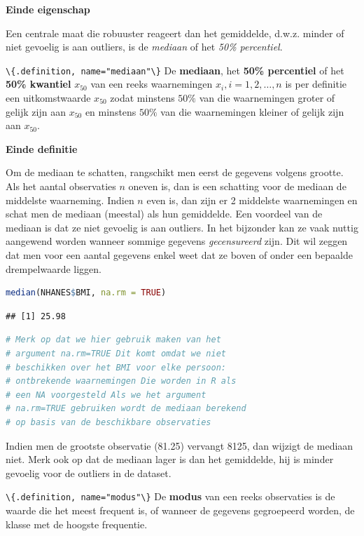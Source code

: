\documentclass[
  12pt,dutch,coursenotes]{book}
\newcommand{\passthrough}[1]{#1}
\begin{document}
\textbf{Einde eigenschap}

Een centrale maat die robuuster reageert dan het gemiddelde, d.w.z. minder
of niet gevoelig is aan outliers, is de \emph{mediaan} of het \emph{50\% percentiel}.

\passthrough{\lstinline!\{.definition, name="mediaan"\}!}
De \textbf{mediaan}, het \textbf{50\% percentiel} of het \textbf{50\%
kwantiel} \(x_{50}\) van een reeks waarnemingen \(x_i, i=1, 2, \dots, n\) is per
definitie een uitkomstwaarde \(x_{50}\) zodat minstens \(50\%\) van die
waarnemingen groter of gelijk zijn aan \(x_{50}\) en minstens \(50\%\) van die
waarnemingen kleiner of gelijk zijn aan \(x_{50}\).

\textbf{Einde definitie}

Om de mediaan te schatten, rangschikt men eerst de gegevens volgens grootte.
Als het aantal observaties \(n\) oneven is, dan is een schatting voor de
mediaan de middelste waarneming. Indien \(n\) even is, dan zijn er 2 middelste
waarnemingen en schat men de mediaan (meestal) als hun gemiddelde. Een
voordeel van de mediaan is dat ze niet gevoelig is aan outliers. In het bijzonder kan
ze vaak nuttig aangewend worden wanneer sommige gegevens \emph{gecensureerd}
zijn. Dit wil zeggen dat men voor een aantal gegevens enkel weet dat ze
boven of onder een bepaalde drempelwaarde liggen.

\begin{lstlisting}[language=R]
median(NHANES$BMI, na.rm = TRUE)
\end{lstlisting}

\begin{lstlisting}
## [1] 25.98
\end{lstlisting}

\begin{lstlisting}[language=R]
# Merk op dat we hier gebruik maken van het
# argument na.rm=TRUE Dit komt omdat we niet
# beschikken over het BMI voor elke persoon:
# ontbrekende waarnemingen Die worden in R als
# een NA voorgesteld Als we het argument
# na.rm=TRUE gebruiken wordt de mediaan berekend
# op basis van de beschikbare observaties
\end{lstlisting}

Indien men de grootste observatie (81.25) vervangt 8125, dan wijzigt de mediaan niet.
Merk ook op dat de mediaan lager is dan het gemiddelde, hij is minder gevoelig voor de outliers in de dataset.

\passthrough{\lstinline!\{.definition, name="modus"\}!}
De \textbf{modus} van een reeks observaties is de waarde die het meest
frequent is, of wanneer de gegevens gegroepeerd worden, de klasse met de
hoogste frequentie.
\end{document}
